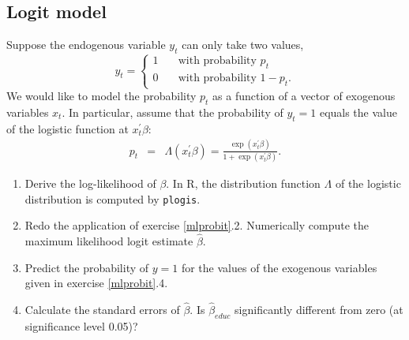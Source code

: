 \documentclass{article}
\begin{document}
\subsection{Logit model\label{mllogit}}

Suppose the endogenous variable $y_{t}$ can only take two values,%
\begin{equation*}
y_{t}=\left\{
\begin{array}{ll}
1 & \quad \text{with probability }p_{t} \\
0 & \quad \text{with probability }1-p_{t}.%
\end{array}%
\right.
\end{equation*}%
We would like to model the probability $p_{t}$ as a function of a vector of
exogenous variables $x_{t}$. In particular, assume that the probability
of $y_{t}=1$ equals the value of the logistic function at $x_{t}^{\prime
}\beta $:%
\begin{eqnarray*}
p_{t} &=&\Lambda \left( x_{t}^{\prime }\beta \right)
=\frac{\exp \left( x_{t}^{\prime }\beta \right) }{1+\exp \left(
x_{t}^{\prime }\beta \right) }.
\end{eqnarray*}

\begin{enumerate}\setlength{\itemsep}{0pt}
\item Derive the log-likelihood of $\beta $. In R, the distribution function
$\Lambda $ of the logistic distribution is computed by \texttt{plogis}.

\item Redo the application of exercise \ref{mlprobit}.2. Numerically compute
the maximum likelihood logit estimate $\hat{\beta}$.

\item Predict the probability of $y=1$ for the values of the exogenous
variables given in exercise \ref{mlprobit}.4.

\item Calculate the standard errors of $\hat{\beta}$. Is $\hat{\beta}_{educ}$
significantly different from zero (at significance level 0.05)?
\end{enumerate}
\end{document}
